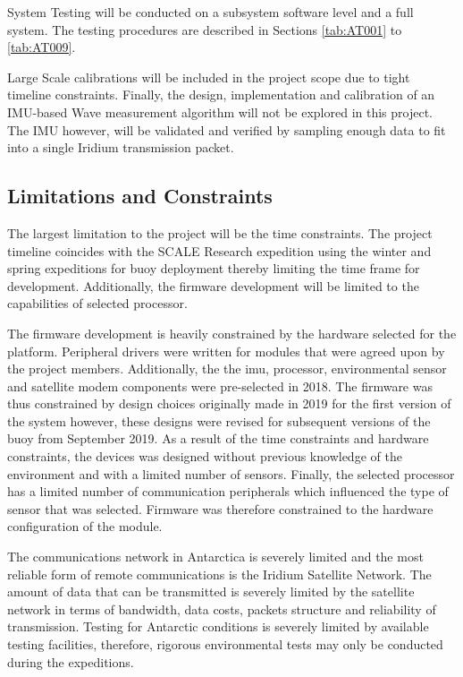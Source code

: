 System Testing will be conducted on a subsystem software level and a full system. The testing procedures are described in Sections  \ref{tab:AT001} to \ref{tab:AT009}. 

Large Scale calibrations will be included in the project scope due to tight timeline constraints. Finally, the  design, implementation and calibration of an IMU-based Wave measurement algorithm will not be explored in this project. The IMU however, will be validated and verified by sampling enough data to fit into a single Iridium transmission packet. 

\subsection{Limitations and Constraints}

The largest limitation to the project will be the time constraints. The project timeline coincides with the SCALE Research expedition using the winter and spring expeditions for buoy deployment thereby limiting the time frame for development. Additionally, the firmware development will be limited to the capabilities of selected processor. \par 

The firmware development is heavily constrained by the hardware selected for the platform. Peripheral drivers were written for modules that were agreed upon by the project members. Additionally, the  the imu, processor, environmental sensor and satellite modem components were pre-selected in 2018. The firmware was thus constrained by design choices originally made in 2019 for the first version of the system however, these designs were revised for subsequent versions of the buoy from September 2019. As a result of the time constraints and hardware constraints, the devices was designed without previous knowledge of the environment and with a limited number of sensors.  Finally, the selected processor has a limited number of communication peripherals which influenced the type of sensor that was selected. Firmware was therefore constrained to the hardware configuration of the module.

The communications network in Antarctica is severely limited and the most reliable form of remote communications is the Iridium Satellite Network. The amount of data that can be transmitted is severely limited by the satellite network in terms of bandwidth, data costs, packets structure and reliability of transmission. Testing for Antarctic conditions is severely limited by available testing facilities, therefore, rigorous environmental tests may only be conducted during the expeditions.\par 

